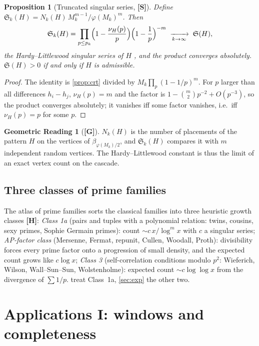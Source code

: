 \documentclass[11pt,a4paper]{article}
\newcommand{\statS}{\textsf{\textbf{[S]}}}
\newcommand{\statG}{\textsf{\textbf{[G]}}}
\newcommand{\statH}{\textsf{\textbf{[H]}}}
\theoremstyle{plain}
\newtheorem{proposition}[theorem]{Proposition}
\theoremstyle{definition}
\newtheorem{reading}[theorem]{Geometric Reading}
\theoremstyle{remark}
\begin{document}
\begin{proposition}[Truncated singular series, \statS]\label{prop:singular}
Define $\mathfrak S_k(H)=N_k(H)\,M_k^{m-1}/\varphi(M_k)^m$. Then
\[
\mathfrak S_k(H)=\prod_{p\le p_k}\Bigl(1-\frac{\nu_H(p)}{p}\Bigr)\Bigl(1-\frac1p\Bigr)^{-m}
\;\xrightarrow[k\to\infty]{}\;\mathfrak S(H),
\]
the Hardy--Littlewood singular series of $H$ \cite{HL}, and the product converges
absolutely. $\mathfrak S(H)>0$ if and only if $H$ is admissible.
\end{proposition}
\begin{proof}
The identity is \cref{prop:crt} divided by $M_k\prod_p(1-1/p)^m$. For $p$
larger than all differences $h_i-h_j$, $\nu_H(p)=m$ and the factor is
$1-\binom m2p^{-2}+O(p^{-3})$, so the product converges absolutely; it vanishes
iff some factor vanishes, i.e.\ iff $\nu_H(p)=p$ for some $p$.
\end{proof}

\begin{reading}[\statG]
$N_k(H)$ is the number of placements of the pattern $H$ on the vertices of
$\beta_{\varphi(M_k)/2}$, and $\mathfrak S_k(H)$ compares it with $m$
independent random vertices. The Hardy--Littlewood constant is thus the
limit of an exact vertex count on the cascade.
\end{reading}

\subsection{Three classes of prime families}
The atlas of prime families \cite{K-atlas} sorts the classical families into
three heuristic growth classes \statH:
\emph{Class 1a} (pairs and tuples with a polynomial relation: twins, cousins,
sexy primes, Sophie Germain primes): count $\sim c\,x/\log^mx$ with $c$ a
singular series;
\emph{AP-factor class} (Mersenne, Fermat, repunit, Cullen, Woodall, Proth):
divisibility forces every prime factor onto a progression of small density,
and the expected count grows like $c\log x$;
\emph{Class 3} (self-correlation conditions modulo $p^2$: Wieferich, Wilson,
Wall--Sun--Sun, Wolstenholme): expected count $\sim c\log\log x$ from the
divergence of $\sum1/p$.
 treat Class~1a, \cref{sec:exp} the other two.

\section{Applications I: windows and completeness}\label{sec:windows}
\end{document}
